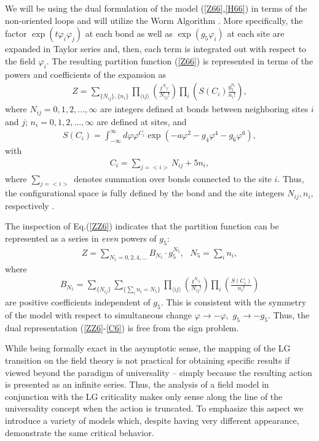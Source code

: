 \documentclass[prb,aps,twocolumn,groupedaddress,floats,showpacs,final]{revtex4}
\def\beq{\begin{eqnarray}}
\def\eeq{\end{eqnarray}}
\begin{document}
We will be using the dual formulation of the model (\ref{Z66},\ref{H66}) in terms of the non-oriented loops and will utilize the Worm Algorithm \cite{WA}. More specifically,  the factor $\exp(t \varphi_i \varphi_j)$ at each bond as well as $\exp(g_5 \varphi_i)$ at each site  are expanded in Taylor series and, then, each term is integrated out with respect to the field $\varphi_i$. The resulting partition function (\ref{Z66}) is represented in terms of the powers and coefficients of the expansion as
\beq
Z=\sum_{\{N_{ij}\}, \{n_i\}} \prod_{\langle ij\rangle}  \left(\frac{t^{N_{ij}}}{N_{ij}!}\right) \prod_i \left(S(C_i) \frac{g_5^{n_i}}{n_i!}\right),
\label{ZZ6}
\eeq
 where $N_{ij}=0,1,2,..., \infty$ are integers defined at bonds between neighboring sites $i$ and $j$; $n_i=0,1,2,..., \infty$ are defined at sites,  and
\beq
S(C_i) = \int_{-\infty}^\infty d\varphi \varphi^{C_i} \exp(- a\varphi^2 - g_4\varphi^4 -g_6\varphi^6),
\label{S6}
\eeq
with
\beq
 C_i =\sum_{j=<i>} N_{ij} + 5n_i ,
\label{C6}
\eeq
where $\sum_{j=<i>}$ denotes summation over bonds connected to the site $i$. Thus, the configurational space is fully defined by
the bond and the site integers $N_{ij}, n_i$, respectively .


The inspection of Eq.(\ref{ZZ6}) indicates that the partition function can be represented as a series in {\it even} powers of $g_5$:
\beq
Z=\sum_{N_5=0,2,4,...} B_{N_5}\cdot g_5^{N_5},\,\,\,\, N_5 = \sum_i n_i,
\label{N5}
\eeq
where
\beq
B_{N_5}=\sum_{\{N_{ij}\}}\sum_{\{\sum_i n_i=N_5\}} \prod_{\langle ij\rangle}  \left(\frac{t^{N_{ij}}}{N_{ij}!}\right) \prod_i \left( \frac{S(C_i)}{n_i!}\right)
\label{CN5}
\eeq
are positive coefficients independent of $g_5$. 
This is consistent with the symmetry of the model with respect to simultaneous change $\varphi  \to - \varphi,\,\, g_5 \to - g_5$.     
Thus, the dual representation (\ref{ZZ6}-\ref{C6})  is free from the sign problem.

While being formally exact in the asymptotic sense, the mapping of the LG transition on the field theory \cite{Hubbard} is not practical for obtaining specific results if viewed beyond the paradigm of universality -- simply because the resulting action is presented as an infinite series. Thus, the analysis of a field model in conjunction with the LG criticality makes only sense along the line of the universality concept when the action is truncated.  To emphasize this aspect
 we introduce a variety of models which, despite having very different appearance, demonstrate the same critical behavior.   
\end{document}
